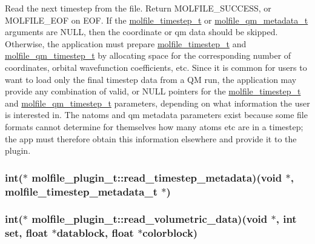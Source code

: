 \-Read the next timestep from the file. \-Return \-M\-O\-L\-F\-I\-L\-E\-\_\-\-S\-U\-C\-C\-E\-S\-S, or \-M\-O\-L\-F\-I\-L\-E\-\_\-\-E\-O\-F on \-E\-O\-F. \-If the \hyperlink{structmolfile__timestep__t}{molfile\-\_\-timestep\-\_\-t} or \hyperlink{structmolfile__qm__metadata__t}{molfile\-\_\-qm\-\_\-metadata\-\_\-t} arguments are \-N\-U\-L\-L, then the coordinate or qm data should be skipped. \-Otherwise, the application must prepare \hyperlink{structmolfile__timestep__t}{molfile\-\_\-timestep\-\_\-t} and \hyperlink{structmolfile__qm__timestep__t}{molfile\-\_\-qm\-\_\-timestep\-\_\-t} by allocating space for the corresponding number of coordinates, orbital wavefunction coefficients, etc. \-Since it is common for users to want to load only the final timestep data from a \-Q\-M run, the application may provide any combination of valid, or \-N\-U\-L\-L pointers for the \hyperlink{structmolfile__timestep__t}{molfile\-\_\-timestep\-\_\-t} and \hyperlink{structmolfile__qm__timestep__t}{molfile\-\_\-qm\-\_\-timestep\-\_\-t} parameters, depending on what information the user is interested in. \-The natoms and qm metadata parameters exist because some file formats cannot determine for themselves how many atoms etc are in a timestep; the app must therefore obtain this information elsewhere and provide it to the plugin. \hypertarget{structmolfile__plugin__t_a0b7ba8f821b21ab609aebe0b02947a71}{
\subsubsection[{read\-\_\-timestep\-\_\-metadata}]{\setlength{\rightskip}{0pt plus 5cm}int($\ast$  {\bf molfile\-\_\-plugin\-\_\-t\-::read\-\_\-timestep\-\_\-metadata})({\bf void} $\ast$, {\bf molfile\-\_\-timestep\-\_\-metadata\-\_\-t} $\ast$)}}\label{structmolfile__plugin__t_a0b7ba8f821b21ab609aebe0b02947a71}
\hypertarget{structmolfile__plugin__t_a535aeec1aea2739b07b2348c239772b9}{
\subsubsection[{read\-\_\-volumetric\-\_\-data}]{\setlength{\rightskip}{0pt plus 5cm}int($\ast$  {\bf molfile\-\_\-plugin\-\_\-t\-::read\-\_\-volumetric\-\_\-data})({\bf void} $\ast$, int set, float $\ast$datablock, float $\ast$colorblock)}}\label{structmolfile__plugin__t_a535aeec1aea2739b07b2348c239772b9}
